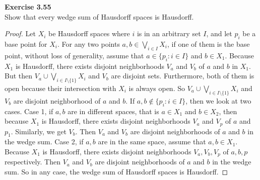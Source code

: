 \documentclass[12pt, a4paper]{article}
\theoremstyle{plain}
\newenvironment{exercise}[2][Exercise]
    { \begin{mdframed}[backgroundcolor=gray!20] \textbf{#1 #2} \\}
    {  \end{mdframed}}
\begin{document}
\begin{exercise}{3.55}
Show that every wedge sum of Hausdorff spaces is Hausdorff.
\end{exercise}
	\begin{proof}
	Let $X_i$ be Hausdorff spaces where $i$ is in an arbitrary set $I$, and let $p_i$ be a base point for $X_i$. For any two points $a,b\in \bigvee_{i\in I}X_i$, if one of them is the base point, without loss of generality, assume that $a\in\{p_i:i\in I\}$ and $b\in X_1$. Because $X_1$ is Hausdorff, there exists disjoint neighborhoods $V_a$ and $V_b$ of $a$ and $b$ in $X_1$. But then $V_a\cup\bigvee_{i\in I\setminus\{1\}}X_i$ and $V_b$ are disjoint sets. Furthermore, both of them is open because their intersection with $X_i$ is always open. So $V_a\cup\bigvee_{i\in I\setminus\{1\}}X_i$ and $V_b$ are disjoint neighborhood of $a$ and $b$. If $a,b\notin \{p_i:i\in I\}$, then we look at two cases. Case 1, if $a,b$ are in different spaces, that is $a\in X_1$ and $b\in X_2$, then because $X_1$ is Hausdorff, there exists disjoint neighborhoods $V_a$ and $V_p$ of $a$ and $p_1$. Similarly, we get $V_b$. Then $V_a$ and $V_b$ are disjoint neighborhoods of $a$ and $b$ in the wedge sum. Case 2, if $a,b$ are in the same space, assume that $a,b\in X_1$. Because $X_1$ is Hausdorff, there exists disjoint neighborhoods $V_a,V_b,V_p$ of $a,b,p$ respectively. Then $V_a$ and $V_b$ are disjoint neighborhoods of $a$ and $b$ in the wedge sum. So in any case, the wedge sum of Hausdorff spaces is Hausdorff.
	\end{proof}
	
\pagebreak
\end{document}
